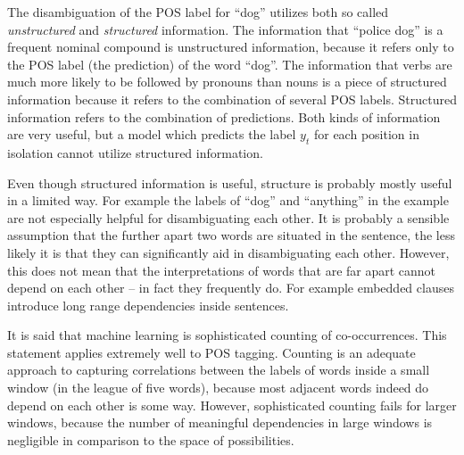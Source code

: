 The disambiguation of the POS label for ``dog'' utilizes both so
called {\it unstructured} and {\it structured} information. The
information that ``police dog'' is a frequent nominal compound is
unstructured information, because it refers only to the POS label (the
prediction) of the word ``dog''. The information that verbs are much
more likely to be followed by pronouns than nouns is a piece of
structured information because it refers to the combination of several
POS labels. Structured information refers to the combination of
predictions. Both kinds of information are very useful, but a model
which predicts the label $y_t$ for each position in isolation cannot
utilize structured information.

Even though structured information is useful, structure is probably
mostly useful in a limited way. For example the labels of ``dog'' and
``anything'' in the example are not especially helpful for
disambiguating each other. It is probably a sensible assumption that
the further apart two words are situated in the sentence, the less
likely it is that they can significantly aid in disambiguating each
other. However, this does not mean that the interpretations of words
that are far apart cannot depend on each other -- in fact they
frequently do. For example embedded clauses introduce long range
dependencies inside sentences.

It is said that machine learning is sophisticated counting of
co-occurrences. This statement applies extremely well to POS
tagging. Counting is an adequate approach to capturing correlations
between the labels of words inside a small window (in the league of
five words), because most adjacent words indeed do depend on each
other is some way. However, sophisticated counting fails for larger
windows, because the number of meaningful dependencies in large
windows is negligible in comparison to the space of possibilities.



